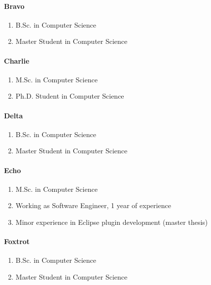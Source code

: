 \documentclass[english]{acm_proc_article-sp}
\begin{document}
\paragraph{Bravo} %
\begin{enumerate}[$-$]
\item B.Sc. in Computer Science
\item Master Student  in Computer Science
\end{enumerate}

\paragraph{Charlie} %
\begin{enumerate}[$-$]
\item M.Sc. in Computer Science
\item Ph.D. Student in Computer Science
\end{enumerate}

\paragraph{Delta} %
\begin{enumerate}[$-$]
\item B.Sc. in Computer Science
\item Master Student  in Computer Science
\end{enumerate}

\paragraph{Echo} %
\begin{enumerate}[$-$]
\item M.Sc. in Computer Science
\item Working as Software Engineer, 1 year of experience
\item Minor experience in Eclipse plugin development (master thesis)
\end{enumerate}

\paragraph{Foxtrot} %
\begin{enumerate}[$-$]
\item B.Sc. in Computer Science
\item Master Student  in Computer Science
\end{enumerate}
\end{document}
